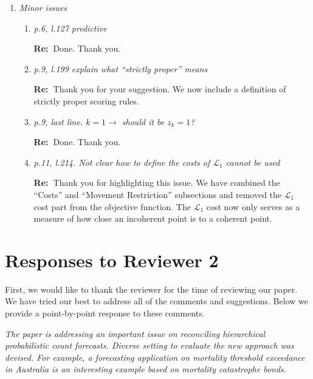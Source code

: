 \documentclass[11pt,a4paper]{article}
\newcommand{\RE}[2][Re:~]{{\color{blue}\textbf{#1}#2}}
\begin{document}
\begin{enumerate}
\begin{enumerate}
    \RE{We thank the reviewer for the very nice suggestion. We have combined the ``Costs'' and ``Movement Restriction'' subsections and removed the $\mathcal{L}_1$ cost part from the objective function. The $\mathcal{L}_1$ cost now only serves as a measure of how close an incoherent point is to a coherent point.}

\end{enumerate}




\item \textit{ Minor issues }

  \begin{enumerate}
    \item  \textit{p.6, l.127 predictive}

    \RE{Done. Thank you.}

    \item \textit{p.9, l.199 explain what ``strictly proper'' means}

    \RE{Thank you for your suggestion. We now include a definition of strictly proper scoring rules.}



    \item \textit{p.9, last line. $k = 1 \rightarrow$ should it be $z_k = 1$?}
    
    \RE{Done. Thank you.}
    \item \textit{p.11, l.214. Not clear how to define the costs of $\mathcal{L}_1$ cannot be used}
    
    \RE{Thank you for highlighting this issue. We have combined the ``Costs'' and ``Movement Restriction'' subsections and removed the $\mathcal{L}_1$ cost part from the objective function. The $\mathcal{L}_1$ cost now only serves as a measure of how close an incoherent point is to a coherent point.}

  \end{enumerate}

\end{enumerate}
\newpage
\section*{Responses to Reviewer 2}\label{reviewer-2-comments}

\RE[]{First, we would like to thank the reviewer for the time of reviewing our paper. We have tried our best to address all of the comments and suggestions. Below we provide a point-by-point response to these comments.}

\textit{The paper is addressing an important issue on reconciling hierarchical probabilistic count forecasts. Diverse setting to evaluate the new approach was devised. For example, a forecasting application on mortality threshold exceedance in Australia is an interesting example based on mortality catastrophe bonds.}
\end{document}
